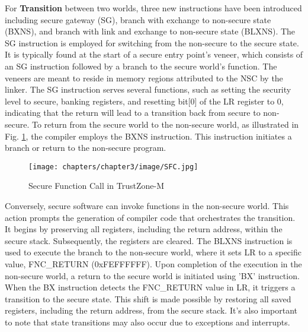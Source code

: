 For \textbf{Transition} between two worlds, three new instructions have been introduced including secure gateway (\gls{SG}), branch with exchange to non-secure state (\gls{BXNS}), and branch with link and exchange to non-secure state (\gls{BLXNS}). The \gls{SG} instruction is employed for switching from the non-secure to the secure state. It is typically found at the start of a secure entry point's veneer, which consists of an \gls{SG} instruction followed by a branch to the secure world's function. The veneers are meant to reside in memory regions attributed to the \gls{NSC} by the linker. The \gls{SG} instruction serves several functions, such as setting the security level to secure, banking registers, and resetting bit[0] of the LR register to 0, indicating that the return will lead to a transition back from secure to non-secure. To return from the secure world to the non-secure world, as illustrated in Fig. \ref{fig:Ttansition}, the compiler employs the \gls{BXNS} instruction. This instruction initiates a branch or return to the non-secure program.

\begin{figure}
  \centering
  \medskip
  \texttt{[image: chapters/chapter3/image/SFC.jpg]}
  \caption[Short caption for Table of Figures]{Secure Function Call in TrustZone-M}
  \label{fig:Ttansition}
\end{figure}

Conversely, secure software can invoke functions in the non-secure world. This action prompts the generation of compiler code that orchestrates the transition. It begins by preserving all registers, including the return address, within the secure stack. Subsequently, the registers are cleared. The \gls{BLXNS} instruction is used to execute the branch to the non-secure world, where it sets LR to a specific value, FNC\_RETURN (0xFEFFFFFF). Upon completion of the execution in the non-secure world, a return to the secure world is initiated using 'BX' instruction. When the BX instruction detects the FNC\_RETURN value in LR, it triggers a transition to the secure state. This shift is made possible by restoring all saved registers, including the return address, from the secure stack. It's also important to note that state transitions may also occur due to exceptions and interrupts.

